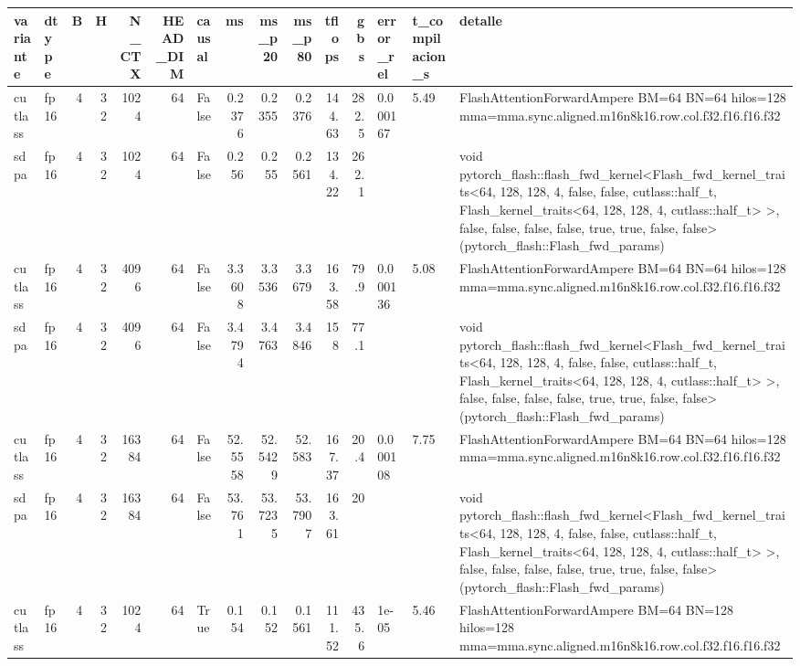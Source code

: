 \begin{table}[htbp]
  \centering\small
  \begin{tabular}{llrrrrlrrrrrlll}
    \toprule
    variante & dtype & B & H & N\_CTX & HEAD\_DIM & causal & ms & ms\_p20 & ms\_p80 & tflops & gbs & error\_rel & t\_compilacion\_s & detalle \\
    \midrule
    cutlass & fp16 & 4 & 32 & 1024 & 64 & False & 0.2376 & 0.2355 & 0.2376 & 144.63 & 282.5 & 0.000167 & 5.49 & FlashAttentionForwardAmpere BM=64 BN=64 hilos=128 mma=mma.sync.aligned.m16n8k16.row.col.f32.f16.f16.f32 \\
    sdpa & fp16 & 4 & 32 & 1024 & 64 & False & 0.256 & 0.255 & 0.2561 & 134.22 & 262.1 &  &  & void pytorch\_flash::flash\_fwd\_kernel<Flash\_fwd\_kernel\_traits<64, 128, 128, 4, false, false, cutlass::half\_t, Flash\_kernel\_traits<64, 128, 128, 4, cutlass::half\_t> >, false, false, false, false, true, true, false, false>(pytorch\_flash::Flash\_fwd\_params) \\
    cutlass & fp16 & 4 & 32 & 4096 & 64 & False & 3.3608 & 3.3536 & 3.3679 & 163.58 & 79.9 & 0.000136 & 5.08 & FlashAttentionForwardAmpere BM=64 BN=64 hilos=128 mma=mma.sync.aligned.m16n8k16.row.col.f32.f16.f16.f32 \\
    sdpa & fp16 & 4 & 32 & 4096 & 64 & False & 3.4794 & 3.4763 & 3.4846 & 158 & 77.1 &  &  & void pytorch\_flash::flash\_fwd\_kernel<Flash\_fwd\_kernel\_traits<64, 128, 128, 4, false, false, cutlass::half\_t, Flash\_kernel\_traits<64, 128, 128, 4, cutlass::half\_t> >, false, false, false, false, true, true, false, false>(pytorch\_flash::Flash\_fwd\_params) \\
    cutlass & fp16 & 4 & 32 & 16384 & 64 & False & 52.5558 & 52.5429 & 52.583 & 167.37 & 20.4 & 0.000108 & 7.75 & FlashAttentionForwardAmpere BM=64 BN=64 hilos=128 mma=mma.sync.aligned.m16n8k16.row.col.f32.f16.f16.f32 \\
    sdpa & fp16 & 4 & 32 & 16384 & 64 & False & 53.761 & 53.7235 & 53.7907 & 163.61 & 20 &  &  & void pytorch\_flash::flash\_fwd\_kernel<Flash\_fwd\_kernel\_traits<64, 128, 128, 4, false, false, cutlass::half\_t, Flash\_kernel\_traits<64, 128, 128, 4, cutlass::half\_t> >, false, false, false, false, true, true, false, false>(pytorch\_flash::Flash\_fwd\_params) \\
    cutlass & fp16 & 4 & 32 & 1024 & 64 & True & 0.154 & 0.152 & 0.1561 & 111.52 & 435.6 & 1e-05 & 5.46 & FlashAttentionForwardAmpere BM=64 BN=128 hilos=128 mma=mma.sync.aligned.m16n8k16.row.col.f32.f16.f16.f32 \\

\end{tabular}
\end{table}
